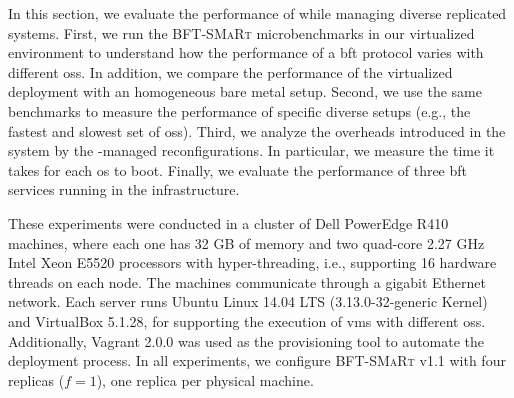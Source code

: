 In this section, we evaluate the performance of \system while managing diverse replicated systems.
First, we run the \textsc{BFT-SMaRt} microbenchmarks in our virtualized environment to understand how the performance of a \gls{bft} protocol varies with different \glspl{os}.
In addition, we compare the performance of the virtualized deployment with an homogeneous bare metal setup.
Second, we use the same benchmarks to measure the performance of specific diverse setups (e.g., the fastest and slowest set of \glspl{os}).
Third, we analyze the overheads introduced in the system by the \system-managed reconfigurations.
In particular, we measure the time it takes for each \gls{os} to boot.
Finally, we evaluate the performance of three \gls{bft} services running in the \system infrastructure.


These experiments were conducted in a cluster of Dell PowerEdge R410 machines, where each one has 32 GB of memory and two quad-core 2.27 GHz Intel Xeon E5520 processors with hyper-threading, i.e., supporting 16 hardware threads on each node.
The machines communicate through a gigabit Ethernet network.
Each server runs Ubuntu Linux 14.04 LTS (3.13.0-32-generic Kernel) and VirtualBox 5.1.28, for supporting the execution of \glspl{vm} with different \glspl{os}. 
Additionally, Vagrant 2.0.0 was used as the provisioning tool to automate the deployment process.
In all experiments, we configure \textsc{BFT-SMaRt} v1.1 with four replicas ($f=1$), one replica per physical machine.

